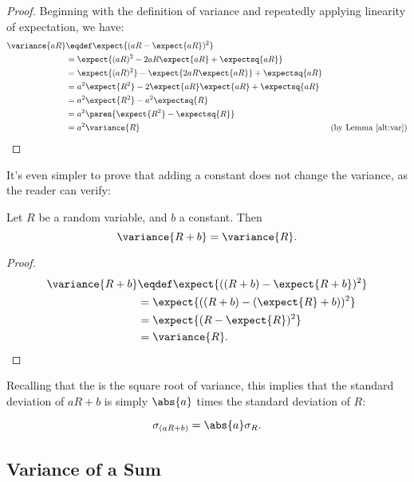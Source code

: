 \begin{proof}
Beginning with the definition of variance and repeatedly applying
linearity of expectation, we have:
\begin{align*}
\variance{aR}
    & \eqdef \expect{(aR-\expect{aR})^2}\\
    & = \expect{(aR)^2 -2aR\expect{aR} + \expectsq{aR}}\\
    & = \expect{(aR)^2} -\expect{2aR\expect{aR}} + \expectsq{aR}\\
    & = a^2\expect{R^2} -2\expect{aR}\expect{aR} + \expectsq{aR}\\
    & = a^2\expect{R^2} -a^2\expectsq{R}\\
    & = a^2\paren{\expect{R^2} - \expectsq{R}}\\
    & = a^2\variance{R} & \text{(by Lemma~\ref{alt:var})}
\end{align*}
\end{proof}

It's even simpler to prove that adding a constant does not change the
variance, as the reader can verify:
\begin{theorem}\label{var+const}
Let $R$ be a random variable, and $b$ a constant. Then
\begin{equation}\label{R+b}
\variance{R+b} = \variance{R}.
\end{equation}
\end{theorem}

\begin{solution}
\begin{proof}
\begin{align*}
\variance{R+b} & \eqdef \expect{((R+b) - \expect{R+b})^2}\\
               & =  \expect{((R+b) - (\expect{R}+ b))^2}\\
               & =  \expect{(R - \expect{R})^2}\\
               & = \variance{R}.
\end{align*}
\end{proof}

\end{solution}

Recalling that the  is the square root of
variance, this implies that the standard deviation of $a R + b$ is simply
$\abs{a}$ times the standard deviation of $R$:
\begin{corollary}
\[
\sigma_{(aR+b)} = \abs{a}\sigma_{R}.
\]
\end{corollary}


\subsection{Variance of a Sum}


